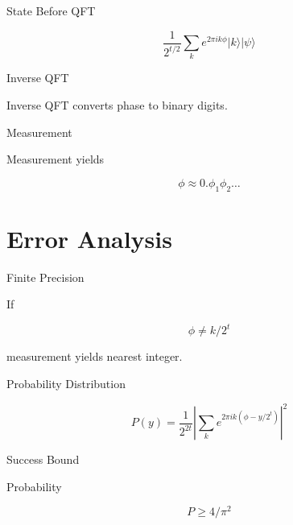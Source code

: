 \documentclass{beamer}
\begin{document}
\begin{frame}{State Before QFT}

\[
\frac{1}{2^{t/2}}
\sum_k e^{2\pi i k\phi}|k\rangle|\psi\rangle
\]

\end{frame}


\begin{frame}{Inverse QFT}

Inverse QFT converts phase to binary digits.

\end{frame}


\begin{frame}{Measurement}

Measurement yields

\[
\phi \approx 0.\phi_1\phi_2\dots
\]

\end{frame}

\section{Error Analysis}

\begin{frame}{Finite Precision}

If

\[
\phi\neq k/2^t
\]

measurement yields nearest integer.

\end{frame}


\begin{frame}{Probability Distribution}

\[
P(y)=
\frac{1}{2^{2t}}
\left|
\sum_k e^{2\pi i k(\phi-y/2^t)}
\right|^2
\]

\end{frame}


\begin{frame}{Success Bound}

Probability

\[
P \ge 4/\pi^2
\]

\end{frame}
\end{document}
